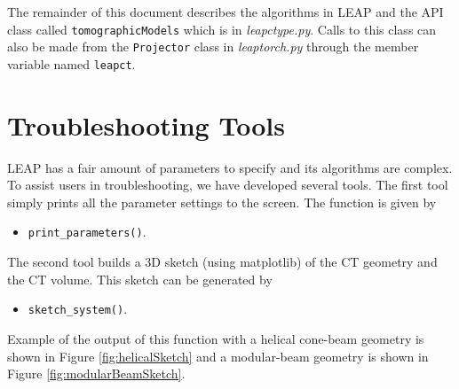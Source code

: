 \documentclass[11pt]{article}
\begin{document}
The remainder of this document describes the algorithms in LEAP and the API class called \texttt{tomographicModels} which is in \textit{leapctype.py}.  Calls to this class can also be made from the \texttt{Projector} class in \textit{leaptorch.py} through the member variable named \texttt{leapct}.

\section{Troubleshooting Tools}

LEAP has a fair amount of parameters to specify and its algorithms are complex.  To assist users in troubleshooting, we have developed several tools.  The first tool simply prints all the parameter settings to the screen.  The function is given by
\begin{itemize}
    \item[] \texttt{print\_parameters()}.
\end{itemize}
The second tool builds a 3D sketch (using matplotlib) of the CT geometry and the CT volume.  This sketch can be generated by
\begin{itemize}
    \item[] \texttt{sketch\_system()}.
\end{itemize}
Example of the output of this function with a helical cone-beam geometry is shown in Figure \ref{fig:helicalSketch} and a modular-beam geometry is shown in Figure \ref{fig:modularBeamSketch}.
\end{document}
